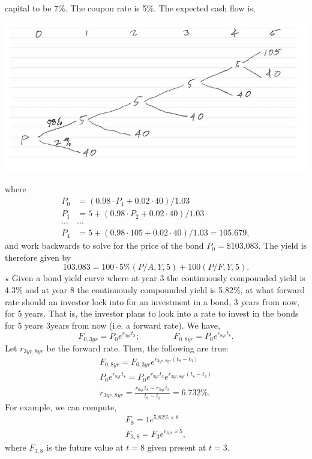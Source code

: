 \documentclass[11pt,landscape]{article}
\begin{document}
\begin{multicols*}{3}
capital to be 7\%. The coupon rate is 5\%. The expected cash flow is,
\begin{center}
    \includegraphics[width=\linewidth]{tree.jpg}
\end{center}
where 
\begin{align*}
    P_0 &= (0.98 \cdot P_1 + 0.02 \cdot 40)/1.03 \\ 
    P_1 &= 5 + (0.98 \cdot P_2 + 0.02 \cdot 40)/1.03 \\
    \cdots & \cdots \\ 
    P_4 &= 5 + (0.98 \cdot 105 + 0.02 \cdot 40)/1.03 = 105.679,
\end{align*}
and work backwards to solve for the price of the bond $P_0=\$103.083$. The yield is therefore given by 
\begin{equation*}
    103.083 = 100 \cdot 5\% (P/A,Y,5) +100(P/F,Y,5).
\end{equation*}
$\star$ Given a bond yield curve where at year 3 the continuously compounded yield is 4.3\% and at year 8 the continuously compounded yield is 5.82\%, at what forward rate should an investor lock into for an investment in a bond, 3 years from now, for 5 years. That is, the investor plans to look into a rate to invest in the bonds for 5 years 3years from now (i.e. a forward rate). We have,
\begin{equation*}
    F_{0,3yr}=P_0e^{r_{3yr}t_3};\quad\quad\quad\quad F_{0,8yr}=P_0e^{r_{8yr}t_8}.
\end{equation*}
Let $r_{3yr,8yr}$ be the forward rate. Then, the following are true:
\begin{align*}
    F_{0,8yr} = F_{0,3yr}e^{r_{3yr,8yr}(t_8-t_3)} \\ 
    P_0e^{r_{8yr}t_8} = P_0 e^{r_{3yr}t_3}e^{r_{3yr,8yr}(t_8-t_3)} \\ 
    r_{3yr,8yr} = \frac{r_{8yr}t_8 - r_{3yr}t_3}{t_8-t_3} = 6.732\%.
\end{align*}
For example, we can compute,
\begin{align*}
    F_8 = 1e^{5.82\% \times 8} \\ 
    F_{3,8} = F_3e^{r_{3,8} \times 5},
\end{align*}
where $F_{3,8}$ is the future value at $t=8$ given present at $t=3.$
\end{multicols*}
\end{document}
